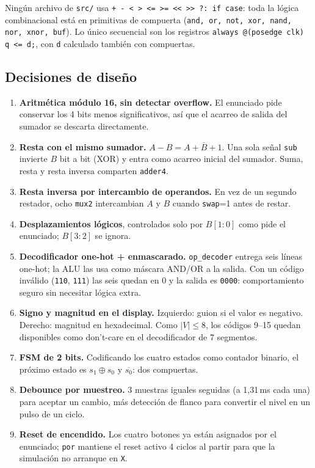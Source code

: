\documentclass[11pt,a4paper]{article}
\newcommand{\bit}[1]{\texttt{#1}}
\newcommand{\sig}[1]{\texttt{#1}}
\newcommand{\nott}[1]{\overline{#1}}
\begin{document}
Ningún archivo de \sig{src/} usa \bit{+ - < > <= >= << >> ?: if case}: toda la lógica combinacional está en primitivas de compuerta (\bit{and, or, not, xor, nand, nor, xnor, buf}). Lo único secuencial son los registros \bit{always @(posedge clk) q <= d;}, con \bit{d} calculado también con compuertas.

\subsection{Decisiones de diseño}

\begin{enumerate}[leftmargin=*,itemsep=2pt]
  \item \textbf{Aritmética módulo 16, sin detectar overflow.} El enunciado pide conservar los 4 bits menos significativos, así que el acarreo de salida del sumador se descarta directamente.
  \item \textbf{Resta con el mismo sumador.} $A-B = A+\nott{B}+1$. Una sola señal \sig{sub} invierte $B$ bit a bit (XOR) y entra como acarreo inicial del sumador. Suma, resta y resta inversa comparten \sig{adder4}.
  \item \textbf{Resta inversa por intercambio de operandos.} En vez de un segundo restador, ocho \sig{mux2} intercambian $A$ y $B$ cuando \sig{swap}=1 antes de restar.
  \item \textbf{Desplazamientos lógicos}, controlados solo por $B[1{:}0]$ como pide el enunciado; $B[3{:}2]$ se ignora.
  \item \textbf{Decodificador one-hot + enmascarado.} \sig{op\_decoder} entrega seis líneas one-hot; la ALU las usa como máscara AND/OR a la salida. Con un código inválido (\bit{110}, \bit{111}) las seis quedan en 0 y la salida es \bit{0000}: comportamiento seguro sin necesitar lógica extra.
  \item \textbf{Signo y magnitud en el display.} Izquierdo: guion si el valor es negativo. Derecho: magnitud en hexadecimal. Como $|V|\le 8$, los códigos 9--15 quedan disponibles como don't-care en el decodificador de 7 segmentos.
  \item \textbf{FSM de 2 bits.} Codificando los cuatro estados como contador binario, el próximo estado es $s_1\oplus s_0$ y $\nott{s_0}$: dos compuertas.
  \item \textbf{Debounce por muestreo.} 3 muestras iguales seguidas (a 1,31\,ms cada una) para aceptar un cambio, más detección de flanco para convertir el nivel en un pulso de un ciclo.
  \item \textbf{Reset de encendido.} Los cuatro botones ya están asignados por el enunciado; \sig{por} mantiene el reset activo 4 ciclos al partir para que la simulación no arranque en \bit{X}.
\end{enumerate}
\end{document}
